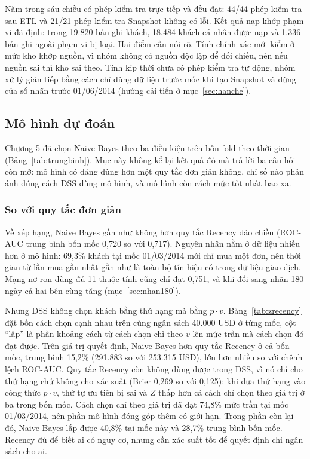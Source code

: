 Năm trong sáu chiều có phép kiểm tra trực tiếp và đều đạt: 44/44 phép kiểm tra sau ETL và 21/21 phép kiểm tra Snapshot không có lỗi. Kết quả nạp khớp phạm vi đã định: trong 19.820 bản ghi khách, 18.484 khách cá nhân được nạp và 1.336 bản ghi ngoài phạm vi bị loại. Hai điểm cần nói rõ. Tính chính xác mới kiểm ở mức kho khớp nguồn, vì nhóm không có nguồn độc lập để đối chiếu, nên nếu nguồn sai thì kho sai theo. Tính kịp thời chưa có phép kiểm tra tự động, nhóm xử lý gián tiếp bằng cách chỉ dùng dữ liệu trước mốc khi tạo Snapshot và dừng cửa sổ nhãn trước 01/06/2014 (hướng cải tiến ở mục~\ref{sec:hanche}).

\subsection{Mô hình dự đoán}
Chương 5 đã chọn Naive Bayes theo ba điều kiện trên bốn fold theo thời gian (Bảng~\ref{tab:trungbinh}). Mục này không kể lại kết quả đó mà trả lời ba câu hỏi còn mở: mô hình có đáng dùng hơn một quy tắc đơn giản không, chỉ số nào phản ánh đúng cách DSS dùng mô hình, và mô hình còn cách mức tốt nhất bao xa.

\subsubsection{So với quy tắc đơn giản}
Về xếp hạng, Naive Bayes gần như không hơn quy tắc Recency đảo chiều (ROC-AUC trung bình bốn mốc 0,720 so với 0,717). Nguyên nhân nằm ở dữ liệu nhiều hơn ở mô hình: 69,3\% khách tại mốc 01/03/2014 mới chỉ mua một đơn, nên thời gian từ lần mua gần nhất gần như là toàn bộ tín hiệu có trong dữ liệu giao dịch. Mạng nơ-ron dùng đủ 11 thuộc tính cũng chỉ đạt 0,751, và khi đổi sang nhãn 180 ngày cả hai bên cùng tăng (mục~\ref{sec:nhan180}).

Nhưng DSS không chọn khách bằng thứ hạng mà bằng $p \cdot v$. Bảng~\ref{tab:zrecency} đặt bốn cách chọn cạnh nhau trên cùng ngân sách 40.000 USD ở từng mốc, cột ``lấp'' là phần khoảng cách từ cách chọn chỉ theo $v$ lên mức trần mà cách chọn đó đạt được. Trên giá trị quyết định, Naive Bayes hơn quy tắc Recency ở cả bốn mốc, trung bình 15,2\% (291.883 so với 253.315 USD), lớn hơn nhiều so với chênh lệch ROC-AUC. Quy tắc Recency còn không dùng được trong DSS, vì nó chỉ cho thứ hạng chứ không cho xác suất (Brier 0,269 so với 0,125): khi đưa thứ hạng vào công thức $p \cdot v$, thứ tự ưu tiên bị sai và $Z$ thấp hơn cả cách chỉ chọn theo giá trị ở ba trong bốn mốc. Cách chọn chỉ theo giá trị đã đạt 74,8\% mức trần tại mốc 01/03/2014, nên phần mô hình đóng góp thêm có giới hạn. Trong phần còn lại đó, Naive Bayes lấp được 40,8\% tại mốc này và 28,7\% trung bình bốn mốc. Recency đủ để biết ai có nguy cơ, nhưng cần xác suất tốt để quyết định chi ngân sách cho ai.

